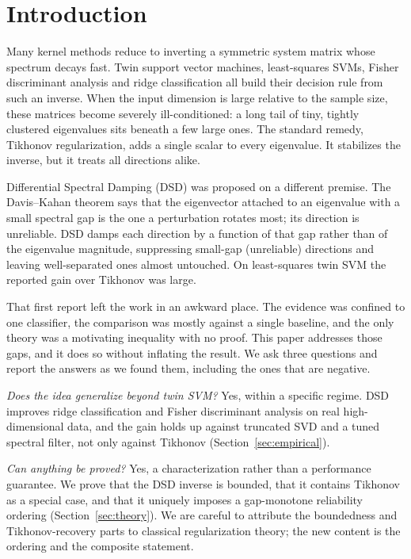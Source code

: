 \documentclass[preprint,12pt]{elsarticle}
\begin{document}
\section{Introduction}
\label{sec:intro}

Many kernel methods reduce to inverting a symmetric system matrix whose spectrum decays fast. Twin
support vector machines, least-squares SVMs, Fisher discriminant analysis and ridge classification all
build their decision rule from such an inverse. When the input dimension is large relative to the
sample size, these matrices become severely ill-conditioned: a long tail of tiny, tightly clustered
eigenvalues sits beneath a few large ones. The standard remedy, Tikhonov regularization, adds a single
scalar to every eigenvalue. It stabilizes the inverse, but it treats all directions alike.

Differential Spectral Damping (DSD) \cite{vashishtha2026dsd} was proposed on a different premise. The
Davis--Kahan theorem \cite{davis1970rotation} says that the eigenvector attached to an eigenvalue with
a small spectral gap is the one a perturbation rotates most; its direction is unreliable. DSD damps
each direction by a function of that gap rather than of the eigenvalue magnitude, suppressing
small-gap (unreliable) directions and leaving well-separated ones almost untouched. On least-squares
twin SVM the reported gain over Tikhonov was large.

That first report left the work in an awkward place. The evidence was confined to one classifier, the
comparison was mostly against a single baseline, and the only theory was a motivating inequality with
no proof. This paper addresses those gaps, and it does so without inflating the result. We ask three
questions and report the answers as we found them, including the ones that are negative.

\emph{Does the idea generalize beyond twin SVM?} Yes, within a specific regime. DSD improves ridge
classification and Fisher discriminant analysis on real high-dimensional data, and the gain holds up
against truncated SVD and a tuned spectral filter, not only against Tikhonov (Section~\ref{sec:empirical}).

\emph{Can anything be proved?} Yes, a characterization rather than a performance guarantee. We prove
that the DSD inverse is bounded, that it contains Tikhonov as a special case, and that it uniquely
imposes a gap-monotone reliability ordering (Section~\ref{sec:theory}). We are careful to attribute the
boundedness and Tikhonov-recovery parts to classical regularization theory; the new content is the
ordering and the composite statement.
\end{document}
